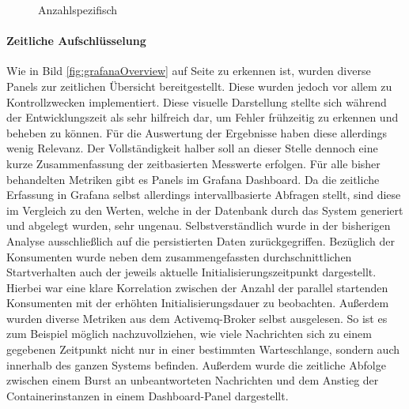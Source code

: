 \begin{figure}[ht!]
  \centering
  \caption[Startzeit Container - Anzahl spezifisch]{Anzahlspezifisch}
  \label{fig:specContainers}
\end{figure}


\paragraph{Zeitliche Aufschlüsselung}
Wie in Bild \ref{fig:grafanaOverview} auf Seite \pageref{fig:grafanaOverview} zu erkennen ist, wurden diverse Panels zur zeitlichen Übersicht bereitgestellt. Diese wurden jedoch vor allem zu Kontrollzwecken implementiert. Diese visuelle Darstellung stellte sich während der Entwicklungszeit als sehr hilfreich dar, um Fehler frühzeitig zu erkennen und beheben zu können. Für die Auswertung der Ergebnisse haben diese allerdings wenig Relevanz. Der Vollständigkeit halber soll an dieser Stelle dennoch eine kurze Zusammenfassung der zeitbasierten Messwerte erfolgen. Für alle bisher behandelten Metriken gibt es Panels im Grafana Dashboard. Da die zeitliche Erfassung in Grafana selbst allerdings intervallbasierte Abfragen stellt, sind diese im Vergleich zu den Werten, welche in der Datenbank durch das System generiert und abgelegt wurden, sehr ungenau. Selbstverständlich wurde in der bisherigen Analyse ausschließlich auf die persistierten Daten zurückgegriffen. Bezüglich der Konsumenten wurde neben dem zusammengefassten durchschnittlichen Startverhalten auch der jeweils aktuelle Initialisierungszeitpunkt dargestellt. Hierbei war eine klare Korrelation zwischen der Anzahl der parallel startenden Konsumenten mit der erhöhten Initialisierungsdauer zu beobachten. Außerdem wurden diverse Metriken aus dem Activemq-Broker selbst ausgelesen. So ist es zum Beispiel möglich nachzuvollziehen, wie viele Nachrichten sich zu einem gegebenen Zeitpunkt nicht nur in einer bestimmten Warteschlange, sondern auch innerhalb des ganzen Systems befinden. Außerdem wurde die zeitliche Abfolge zwischen einem Burst an unbeantworteten Nachrichten und dem Anstieg der Containerinstanzen in einem Dashboard-Panel dargestellt.

